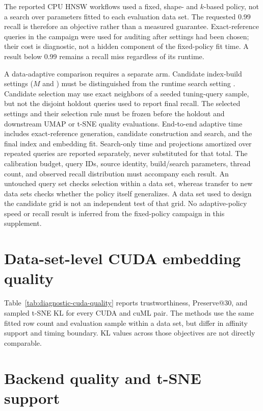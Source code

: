 \documentclass[article]{jss}
\newcommand{\fastEmbedR}{\pkg{fastEmbedR}\xspace}
\begin{document}
The reported CPU HNSW workflows used a fixed, shape- and $k$-based policy,
not a search over parameters fitted to each evaluation data set. The
requested 0.99 recall is therefore an objective rather than a measured
guarantee. Exact-reference queries in the campaign were used for auditing
after settings had been chosen; their cost is diagnostic, not a hidden
component of the fixed-policy fit time. A result below 0.99 remains a
recall miss regardless of its runtime.

A data-adaptive comparison requires a separate arm. Candidate index-build
settings ($M$ and ) must be distinguished from the
runtime search setting . Candidate selection may use exact
neighbors of a seeded tuning-query sample, but not the disjoint holdout
queries used to report final recall. The selected settings and their
selection rule must be frozen before the holdout and downstream UMAP or
t-SNE quality evaluations. End-to-end adaptive time includes exact-reference
generation, candidate construction and search, and the final index and
embedding fit. Search-only time and projections amortized over repeated
queries are reported separately, never substituted for that total. The
calibration budget, query IDs, source identity, build/search parameters,
thread count, and observed recall distribution must accompany each result.
An untouched query set checks selection within a data set, whereas transfer
to new data sets checks whether the policy itself generalizes. A data set
used to design the candidate grid is not an independent test of that grid.
No adaptive-policy speed or recall result is inferred from the fixed-policy
campaign in this supplement.

\section{Data-set-level CUDA embedding quality}

Table~\ref{tab:diagnostic-cuda-quality} reports trustworthiness,
Preserve@30, and sampled t-SNE KL for every CUDA \fastEmbedR and cuML
pair. The methods use the same fitted row count and evaluation sample
within a data set, but differ in affinity support and timing boundary.
KL values across those objectives are not directly comparable.



\section{Backend quality and t-SNE support}
\end{document}
